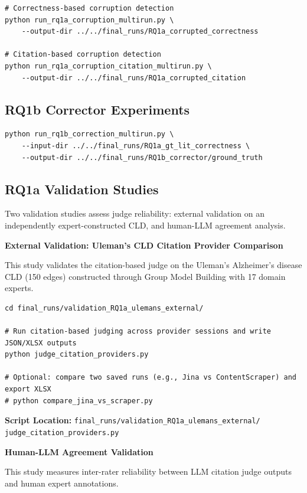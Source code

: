 \begin{verbatim}
# Correctness-based corruption detection
python run_rq1a_corruption_multirun.py \
    --output-dir ../../final_runs/RQ1a_corrupted_correctness

# Citation-based corruption detection
python run_rq1a_corruption_citation_multirun.py \
    --output-dir ../../final_runs/RQ1a_corrupted_citation
\end{verbatim}

\subsection{RQ1b Corrector Experiments}

\begin{verbatim}
python run_rq1b_correction_multirun.py \
    --input-dir ../../final_runs/RQ1a_gt_lit_correctness \
    --output-dir ../../final_runs/RQ1b_corrector/ground_truth
\end{verbatim}

\subsection{RQ1a Validation Studies}
\label{sec:rq1a_validation}

Two validation studies assess judge reliability: external validation on an independently expert-constructed CLD, and human-LLM agreement analysis.

\textbf{External Validation: Uleman's CLD Citation Provider Comparison}

This study validates the citation-based judge on the Uleman's Alzheimer's disease CLD (150 edges) constructed through Group Model Building with 17 domain experts.

\begin{verbatim}
cd final_runs/validation_RQ1a_ulemans_external/

# Run citation-based judging across provider sessions and write JSON/XLSX outputs
python judge_citation_providers.py

# Optional: compare two saved runs (e.g., Jina vs ContentScraper) and export XLSX
# python compare_jina_vs_scraper.py
\end{verbatim}

\textbf{Script Location:} \texttt{final\_runs/validation\_RQ1a\_ulemans\_external/} \texttt{judge\_citation\_providers.py}

\textbf{Human-LLM Agreement Validation}

This study measures inter-rater reliability between LLM citation judge outputs and human expert annotations.

